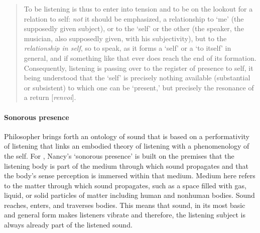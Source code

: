 \begin{quote}
	To be listening is thus to enter into tension and to be on the lookout for a relation to self: \textit{not} it should be emphasized, a relationship to `me' (the supposedly given subject), or to the `self' or the other (the speaker, the musician, also supposedly given, with his subjectivity), but to the \textit{relationship in self}, so to speak, as it forms a `self' or a `to itself' in general, and if something like that ever does reach the end of its formation. Consequently, listening is passing over to the register of presence to self, it being understood that the `self' is precisely nothing available (substantial or subsistent) to which one can be `present,' but precisely the resonance of a return [\textit{renvoi}]. \parencite[12]{Nan07:Lis}
\end{quote} %

\paragraph{Sonorous presence}
Philosopher \textcite{Nan07:Lis} brings forth an ontology of sound that is based on a performativity of listening that links an embodied theory of listening with a phenomenology of the self. For \textcite{Gra15:The}, Nancy’s `sonorous presence’ is built on the premises that the listening body is part of the medium through which sound propagates and that the body's sense perception is immersed within that medium. Medium here refers to the matter through which sound propagates, such as a space filled with gas, liquid, or solid particles of matter including human and nonhuman bodies. Sound reaches, enters, and traverses bodies. This means that sound, in its most basic and general form makes listeners vibrate and therefore, the listening subject is always already part of the listened sound.

